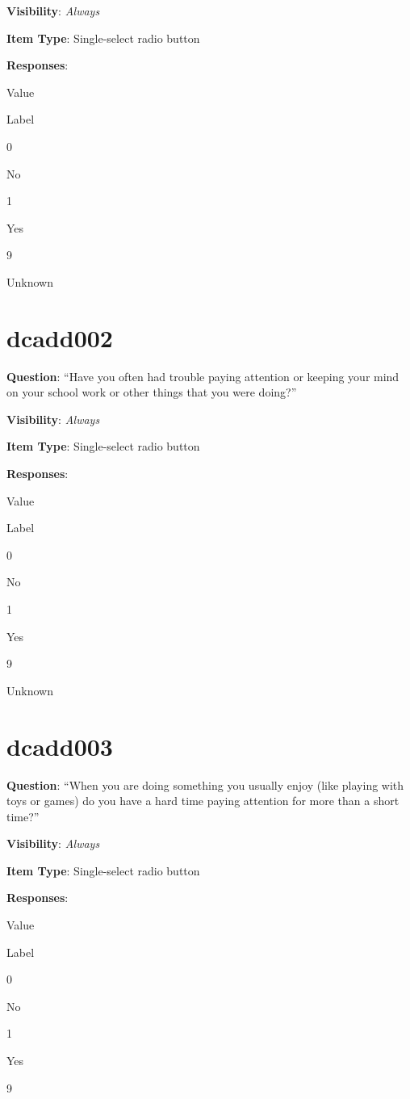\documentclass[]{book}
\begin{document}
\textbf{Visibility}: \emph{Always}

\textbf{Item Type}: Single-select radio button

\textbf{Responses}:

Value

Label

0

No

1

Yes

9

Unknown

\hypertarget{dcadd002}{%
\section{dcadd002}\label{dcadd002}}

\textbf{Question}: ``Have you often had trouble paying attention or keeping your mind on your school work or other things that you were doing?''

\textbf{Visibility}: \emph{Always}

\textbf{Item Type}: Single-select radio button

\textbf{Responses}:

Value

Label

0

No

1

Yes

9

Unknown

\hypertarget{dcadd003}{%
\section{dcadd003}\label{dcadd003}}

\textbf{Question}: ``When you are doing something you usually enjoy (like playing with toys or games) do you have a hard time paying attention for more than a short time?''

\textbf{Visibility}: \emph{Always}

\textbf{Item Type}: Single-select radio button

\textbf{Responses}:

Value

Label

0

No

1

Yes

9
\end{document}

